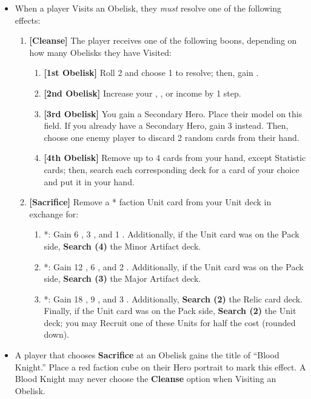 \begin{multicols*}{2}
\begin{itemize}
  \item When a player Visits an Obelisk, they \textit{must} resolve one of the following effects:
  \begin{enumerate}[leftmargin=15pt]
    \item \textbf{[Cleanse]} The player receives one of the following boons, depending on how many Obelisks they have Visited:
    \begin{enumerate}
      \item \textbf{[1st Obelisk]} Roll 2  and choose 1 to resolve; then, gain .
      \item \textbf{[2nd Obelisk]} Increase your , , or  income by 1 step.
      \item \textbf{[3rd Obelisk]} You gain a Secondary Hero. Place their model on this field. If you already have a Secondary Hero, gain 3  instead. Then, choose one enemy player to discard 2 random cards from their hand.
      \item \textbf{[4th Obelisk]} Remove up to 4 cards from your hand, except Statistic cards; then, search each corresponding deck for a card of your choice and put it in your hand.
    \end{enumerate}
    \item \textbf{[Sacrifice]} Remove a * faction Unit card from your Unit deck in exchange for:
    \begin{enumerate}
      \item *: Gain 6 , 3 , and 1 . Additionally, if the Unit card was on the Pack side, \textbf{Search (4)} the Minor Artifact deck.
      \item *: Gain 12 , 6 , and 2 . Additionally, if the Unit card was on the Pack side, \textbf{Search (3)} the Major Artifact deck.
      \item *: Gain 18 , 9 , and 3 . Additionally, \textbf{Search (2)} the Relic card deck. Finally, if the Unit card was on the Pack side, \textbf{Search (2)} the  Unit deck; you may Recruit one of these Units for half the cost (rounded down).
    \end{enumerate}
  \end{enumerate}
  \item A player that chooses \textbf{Sacrifice} at an Obelisk gains the title of ``\textcolor{darkcandyapplered}{Blood Knight}.'' Place a red faction cube on their Hero portrait to mark this effect. A \textcolor{darkcandyapplered}{Blood Knight} may never choose the \textbf{Cleanse} option when Visiting an Obelisk.

\end{itemize}
\end{multicols*}
